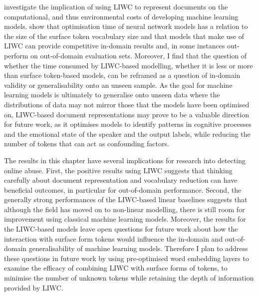  investigate the implication of using LIWC to represent documents on the computational, and thus environmental costs of developing machine learning models.  
 show that optimisation time of neural network models has a relation to the size of the surface token vocabulary size and that models that make use of LIWC can provide competitive in-domain results and, in some instances out-perform on out-of-domain evaluation sets.  
Moreover, I find that the question of whether the time consumed by LIWC-based modelling, whether it is less or more than surface token-based models, can be reframed as a question of in-domain validity or generalisability onto an unseen sample.  
As the goal for machine learning models is ultimately to generalise onto unseen data where the distributions of data may not mirror those that the models have been optimised on, LIWC-based document representations may prove to be a valuable direction for future work, as it optimises models to identify patterns in cognitive processes and the emotional state of the speaker and the output labels, while reducing the number of tokens that can act as confounding factors.  
  
The results in this chapter have several implications for research into detecting online abuse.  
First, the positive results using LIWC suggests that thinking carefully about document representation and vocabulary reduction can have beneficial outcomes, in particular for out-of-domain performance.  
Second, the generally strong performances of the LIWC-based linear baselines suggests that although the field has moved on to non-linear modelling, there is still room for improvement using classical machine learning models.  
Moreover, the results for the LIWC-based models leave open questions for future work about how the interaction with surface form tokens would influence the in-domain and out-of-domain generalisability of machine learning models.  
Therefore I plan to address these questions in future work by using pre-optimised word embedding layers to examine the efficacy of combining LIWC with surface forms of tokens, to minimise the number of unknown tokens while retaining the depth of information provided by LIWC.  
  
